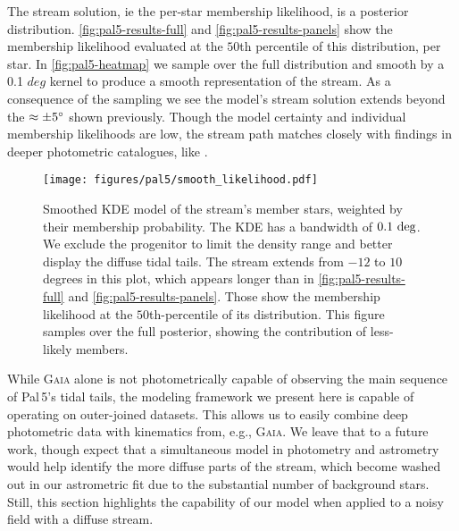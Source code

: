 \documentclass[twocolumn]{aastex631}
\newcommand{\code}[1]{\textsc{#1}}
\newcommand{\package}[1]{\code{#1}}
\newcommand{\stream}[1]{#1}
\begin{document}
        The stream solution, ie the per-star membership likelihood, is a
        posterior distribution. \autoref{fig:pal5-results-full} and
        \autoref{fig:pal5-results-panels} show the membership likelihood
        evaluated at the $50$th percentile of this distribution, per star. In
        \autoref{fig:pal5-heatmap} we sample over the full distribution and
        smooth by a 0.1 $deg$ kernel to produce a smooth representation of the
        stream. As a consequence of the sampling we see the model's stream
        solution extends beyond the $\approx \pm5\degree$ shown previously.
        Though the model certainty and individual membership likelihoods are
        low, the stream path matches closely with findings in deeper photometric
        catalogues, like \citet{Ibata+2017}.

        \begin{figure}[h]
            \centering
            \texttt{[image: figures/pal5/smooth\_likelihood.pdf]}
            \caption{%
                Smoothed KDE model of the stream's member stars, weighted by
                their membership probability. The KDE has a bandwidth of $0.1 \
                \rm{deg}$. We exclude the progenitor to limit the density range
                and better display the diffuse tidal tails. The stream extends
                from $-12$ to $10$ degrees in this plot, which appears longer
                than in \autoref{fig:pal5-results-full} and
                \autoref{fig:pal5-results-panels}. Those show the membership
                likelihood at the $50$th-percentile of its distribution. This
                figure samples over the full posterior, showing the contribution
                of less-likely members.
            }
            \label{fig:pal5-heatmap}
        \end{figure}

        While \package{Gaia} alone is not photometrically capable of observing
        the main sequence of \stream{Pal\,5}'s tidal tails, the modeling
        framework we present here is capable of operating on outer-joined
        datasets. This allows us to easily combine deep photometric data with
        kinematics from, e.g., \package{Gaia}.  We leave that to a future work,
        though expect that a simultaneous model in photometry and astrometry
        would help identify the more diffuse parts of the stream, which become
        washed out in our astrometric fit due to the substantial number of
        background stars. Still, this section highlights the capability of our
        model when applied to a noisy field with a diffuse stream.
\end{document}
